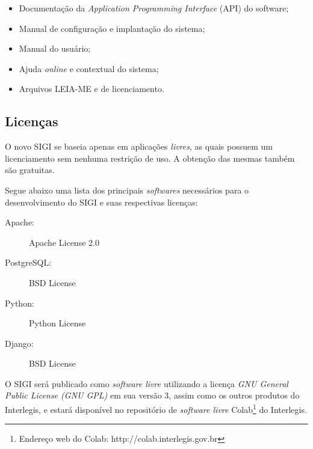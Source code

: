 \begin{itemize}
\item Documentação da \textit{Application Programming Interface} (API)
  do software;
\item Manual de configuração e implantação do sistema;
\item Manual do usuário;
\item Ajuda \textit{online} e contextual do sistema;
\item Arquivos LEIA-ME e de licenciamento.
\end{itemize}

\subsection{Licenças}
O novo SIGI se baseia apenas em aplicações \emph{livres}, as quais
possuem um licenciamento sem nenhuma restrição de uso. A obtenção das
mesmas também são gratuitas.

Segue abaixo uma lista dos principais \emph{softwares} necessários
para o desenvolvimento do SIGI e suas respectivas licenças:

\begin{description}
\item[Apache:] Apache License 2.0
\item[PostgreSQL:] BSD License
\item[Python:] Python License
\item[Django:] BSD License
\end{description}

O SIGI será publicado como \emph{software livre} utilizando a licença
\textit{GNU General Public License (GNU GPL)} em sua versão 3, assim
como os outros produtos do Interlegis, e estará disponível no
repositório de \emph{software livre} Colab\footnote{Endereço web do
  Colab: http://colab.interlegis.gov.br} do Interlegis.
%
%
